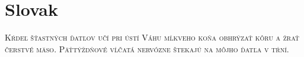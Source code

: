 

\presection\section*{\checkno Slovak}\postsection

\noindent\textsc{Kŕdeľ šťastných ďatľov učí pri ústí Váhu mĺkveho koňa obhrýzať kôru a žrať čerstvé mäso.
Päťtýždňové vĺčatá nervózne štekajú na môjho ďatľa v tŕní.}